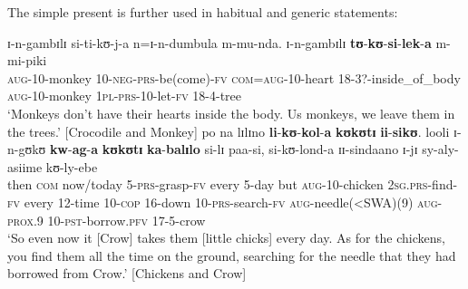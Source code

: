 The simple present is further used in habitual and generic statements:
\begin{exe}
\ex \label{exPRSHABGEN1} \gll ɪ-n-gambɪlɪ si-ti-kʊ-j-a n=ɪ-n-dumbula m-mu-nda. ɪ-n-gambɪlɪ \textbf{tʊ}-\textbf{kʊ}-\textbf{si}-\textbf{lek}-\textbf{a} m-mi-piki\\
\textsc{aug}-10-monkey 10-\textsc{neg}-\textsc{prs}-be(come)-\textsc{fv} \textsc{com}=\textsc{aug}-10-heart 18-3?-inside\_of\_body \textsc{aug}-10-monkey \textsc{1pl}-\textsc{prs}-10-let-\textsc{fv} 18-4-tree\\
\glt \lq Monkeys don't have their hearts inside the body. Us monkeys, we leave them in the trees.' [Crocodile and Monkey]
\ex \label{exPRSHABGEN2} \gll po na lɪlɪno \textbf{li}-\textbf{kʊ}-\textbf{kol}-\textbf{a} \textbf{kʊkʊtɪ} \textbf{ii}-\textbf{sikʊ}. looli ɪ-n-gʊkʊ \textbf{kw}-\textbf{ag}-\textbf{a} \textbf{kʊkʊtɪ} \textbf{ka}-\textbf{balɪlo} si-lɪ paa-si, si-kʊ-lond-a ɪɪ-sindaano ɪ-jɪ sy-aly-asiime kʊ-ly-ebe\\
then \textsc{com} now/today 5-\textsc{prs}-grasp-\textsc{fv} every 5-day but \textsc{aug}-10-chicken \textsc{2sg.prs}-find-\textsc{fv} every 12-time 10-\textsc{cop} 16-down 10-\textsc{prs}-search-\textsc{fv} \textsc{aug}-needle(<SWA)(9) \textsc{aug}-\textsc{prox.9} 10-\textsc{pst}-borrow.\textsc{pfv} 17-5-crow\\
\glt \lq So even now it [Crow] takes them [little chicks] every day. As for the chickens, you find them all the time on the ground, searching for the needle that they had borrowed from Crow.' [Chickens and Crow]
\end{exe}

